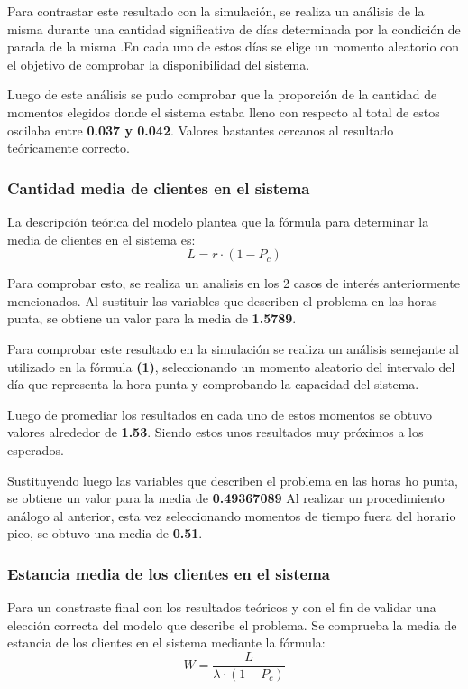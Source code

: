 \documentclass{article}
\begin{document}
			Para contrastar este resultado con la simulación, se realiza un análisis de la misma durante una cantidad significativa de días determinada por la condición de parada de la misma .En cada uno de estos días se elige un momento aleatorio con el objetivo de comprobar la disponibilidad del sistema.
		
			Luego de este análisis se pudo comprobar que la proporción de la cantidad de momentos elegidos donde el sistema estaba lleno con respecto al total de estos oscilaba entre \textbf{0.037 y 0.042}. Valores bastantes cercanos al resultado teóricamente correcto.
			
			\subsubsection*{Cantidad media de clientes en el sistema}
			La descripción teórica del modelo plantea que la fórmula para determinar la media de clientes en el sistema es:
			\[
			L = r \cdot (1 - P_c)
			\]
			
			Para comprobar esto, se realiza un analisis en los 2 casos de interés anteriormente mencionados. Al sustituir las variables que describen el problema en las horas punta, se obtiene un valor para la media de \textbf{1.5789}. 
			
			Para comprobar este resultado en la simulación se realiza un análisis semejante al utilizado en la fórmula \textbf{(1)}, seleccionando un momento aleatorio del intervalo del día que representa la hora punta y comprobando la capacidad del sistema.
			
			Luego de promediar los resultados en cada uno de estos momentos se obtuvo valores alrededor de \textbf{1.53}. Siendo estos unos resultados muy próximos a los esperados.
			
			Sustituyendo luego las variables que describen el problema en las horas ho punta, se obtiene un valor para la media de  \textbf{0.49367089}
			Al realizar un procedimiento análogo al anterior, esta vez seleccionando momentos de tiempo fuera del horario pico, se obtuvo
			una media de \textbf{0.51}.
		
			
			\subsubsection*{Estancia media de los clientes en el sistema}
			Para un constraste final con los resultados teóricos y con el fin de validar una elección correcta del modelo que describe el problema. Se comprueba la media de estancia de los clientes en el sistema mediante la fórmula: 
			\[
			W = \frac{L}{\lambda \cdot (1 - P_c)}
			\]
			
\end{document}
